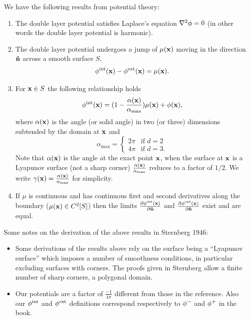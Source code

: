 We have the following results from potential theory:\cite{Sternberg1946}
\begin{enumerate}
\item The double layer potential satisfies Laplace's equation $\nabla^2 \phi = 0$ (in other words the double layer potential is harmonic).%

\item The double layer potential undergoes a jump of $\mu(\mathbf{x})$ moving in the direction $\mathbf{\hat{n}}$ across a smooth surface $S$, \ie
  \begin{equation}
    \label{eq:15}
    \phi^{\text{int}}(\mathbf{x}) - \phi^{\text{ext}}(\mathbf{x}) = \mu(\mathbf{x}).
  \end{equation}

\item For $\mathbf{x} \in S$ the following relationship holds
  \begin{equation}
    \phi^{\text{int}}(\mathbf{x}) = (1 - \frac{\alpha(\mathbf{x})}{\alpha_{\text{max}}}) \mu(\mathbf{x}) + \phi(\mathbf{x}),
    \label{eq:22}
  \end{equation}
  where $\alpha(\mathbf{x})$ is the angle (or solid angle) in two (or three) dimensions subtended by the domain at $\mathbf{x}$ and
\begin{equation*}
  \alpha_{\text{max}} =
  \begin{cases}
    2 \pi & \text{if } d=2 \\
    4 \pi & \text{if } d=3.
  \end{cases}\label{eq:16}
\end{equation*}
Note that $\alpha(\mathbf{x})$ is the angle at the exact point $\mathbf{x}$, when the surface at $\mathbf{x}$ is a Lyapunov surface (\ie not a sharp corner) $\frac{\alpha(\mathbf{x})}{\alpha_{\text{max}}}$ reduces to a factor of $1/2$.
We write $\gamma(\mathbf{x}) = \frac{\alpha(\mathbf{x})}{\alpha_{\text{max}}}$ for simplicity.

\item If $\mu$ is continuous and has continuous first and second derivatives along the boundary (\ie $\mu(\mathbf{x}) \in C^2[S]$) then the limits $\frac{\partial \phi^{\text{int}}(\mathbf{x})}{\partial \mathbf{\hat{n}}}$ and $\frac{\partial \phi^{\text{ext}}(\mathbf{x})}{\partial \mathbf{\hat{n}}}$ exist and are equal.

\end{enumerate}

Some notes on the derivation of the above results in Sternberg 1946\cite{Sternberg1946}:
\begin{itemize}
\item Some derivations of the results above rely on the surface being a ``Lyapunov surface'' which imposes a number of smoothness conditions, in particular excluding surfaces with corners.
The proofs given in Sternberg allow a finite number of sharp corners, \ie a polygonal domain.
\item Our potentials are a factor of $\frac{-1}{4 \pi}$ different from those in the reference.
Also our $\phi^{\text{int}}$ and $\phi^{\text{ext}}$ definitions correspond respectively to $\phi^-$ and $\phi^+$ in the book.
\end{itemize}


